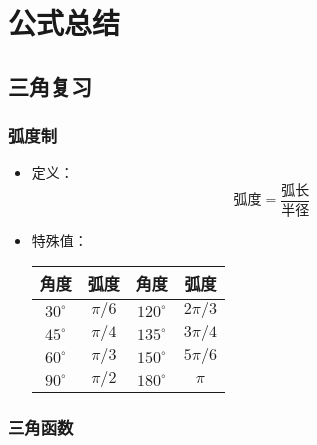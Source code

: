 
\chapter{公式总结}

\section{三角复习}

\subsection{弧度制}

\begin{itemize}
    \item 定义：
    \begin{equation*}
        \textrm{弧度}=\frac{\textrm{弧长}}{\textrm{半径}}
    \end{equation*}
    \item 特殊值：
    \begin{center}
        \renewcommand\arraystretch{1.2}
        \begin{tabular}{c|c|c|c}
            \hline
            角度&弧度&角度&弧度\\\hline
            $30^\circ$&$\pi/6$&$120^\circ$&$2\pi/3$\\
            $45^\circ$&$\pi/4$&$135^\circ$&$3\pi/4$\\
            $60^\circ$&$\pi/3$&$150^\circ$&$5\pi/6$\\
            $90^\circ$&$\pi/2$&$180^\circ$&$\pi$\\
            \hline
        \end{tabular}
    \end{center}
\end{itemize}

\subsection{三角函数}

